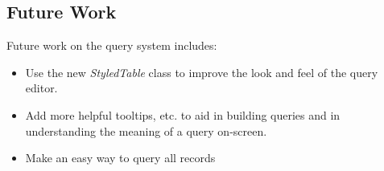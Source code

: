 \documentclass[11pt]{article}
\begin{document}
\subsection{Future Work}

Future work on the query system includes:

\begin{itemize}

\item Use the new \emph{StyledTable} class to improve the look and feel of the query editor.
\item Add more helpful tooltips, etc. to aid in building queries and in understanding the meaning of a query on-screen.

 \item Make an easy way to query all records
\end{itemize}
\end{document}
